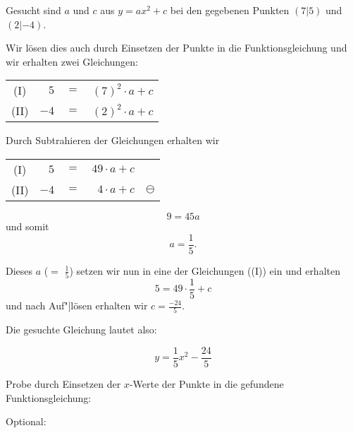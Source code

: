 \begin{rezept}{}{}
  Gesucht sind $a$ und $c$ aus $y = ax^2 + c$ bei den gegebenen
  Punkten $(7|5)$ und $(2|-4)$.

  Wir lösen dies auch durch Einsetzen der Punkte in die
  Funktionsgleichung und wir erhalten zwei Gleichungen:


  \begin{tabular}{c | r  c  r |}
    (I)  &  $5$ & $=$ & $(7)^2\cdot{} a + c$ \\
    (II) & $-4$ & $=$ &  $(2)^2\cdot{} a + c$ \\
  \end{tabular}

  Durch Subtrahieren der Gleichungen erhalten wir

  \begin{tabular}{c | r  c  r | c}
    (I)  &  $5$ & $=$ & $49\cdot{} a + c$ & \,\\
    (II) & $-4$ & $=$ &  $4\cdot{} a + c$ & $\ominus$\\
  \end{tabular}

  $$9 = 45a$$ und somit
  $$a =\frac{1}{5}.$$

  Dieses $a$ ($=$ $\frac{1}{5}$) setzen wir nun in eine der Gleichungen
  (\zB (I)) ein und erhalten
  $$5=49\cdot{}\frac{1}{5} + c$$
  und nach Auf"|lösen erhalten wir $c=\frac{-24}{5}$.

  Die gesuchte Gleichung lautet also:

  $$y = \frac{1}{5}x^2 - \frac{24}{5}$$
\end{rezept}

Probe durch Einsetzen der $x$-Werte der Punkte in die gefundene Funktionsgleichung:

\TNTeop{}
Optional:

